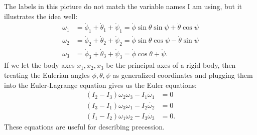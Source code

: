 \documentclass{article}
\begin{document}
\par
The labels in this picture do not match the variable names I am using, but it illustrates the idea well:
\begin{align*}
    \omega_1 &= \dot{\phi}_1 + \dot{\theta}_1 + \dot{\psi}_1 = \dot{\phi} \sin \theta \sin \psi + \dot{\theta} \cos \psi \\
    \omega_2 &= \dot{\phi}_2 + \dot{\theta}_2 + \dot{\psi}_2 = \dot{\phi} \sin \theta \cos \psi - \dot{\theta} \sin \psi \\
    \omega_3 &= \dot{\phi}_3 + \dot{\theta}_3 + \dot{\psi}_3 = \dot{\phi} \cos \theta + \dot{\psi}.
\end{align*}
If we let the body axes $x_1, x_2, x_3$ be the principal axes of a rigid body, then treating the Eulerian angles $\phi, \theta, \psi$ as generalized coordinates and plugging them into the Euler-Lagrange equation gives us the Euler equations:
\begin{align*}
    (I_2-I_3)\omega_2\omega_3 - I_1 \dot{\omega_1} &= 0 \\
    (I_3-I_1)\omega_3\omega_1 - I_2 \dot{\omega_2} &= 0 \\
    (I_1-I_2)\omega_1\omega_2 - I_3 \dot{\omega_3} &= 0.
\end{align*}
These equations are useful for describing precession.
\end{document}
